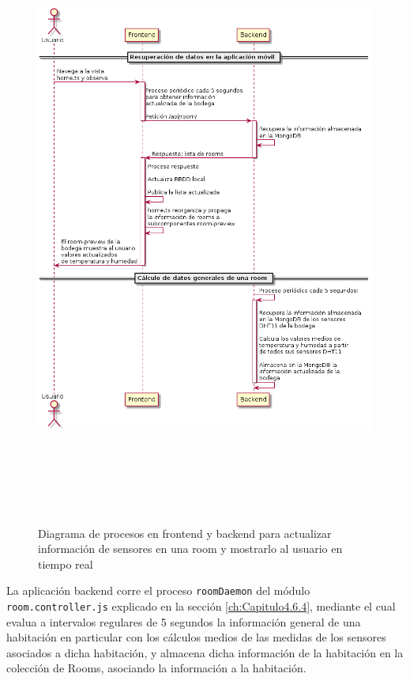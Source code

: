 \begin{figure}[hbt!]
\centering
\label{fig:usecase3sub2}
\includegraphics[height=8in]{figures/diagrams/use-cases/sensorInfo2.png}
\caption[usecase3sub2]{Diagrama de procesos en frontend y backend para actualizar información de sensores en una room y mostrarlo al usuario en tiempo real\footnotemark}
\end{figure}

La aplicación backend corre el proceso \verb|roomDaemon| del módulo \verb|room.controller.js| explicado en la sección \ref{ch:Capitulo4.6.4}, mediante el cual evalua a intervalos regulares de 5 segundos la información general de una habitación en particular con los cálculos medios de las medidas de los sensores asociados a dicha habitación, y almacena dicha información de la habitación en la colección de Rooms, asociando la información a la habitación.

